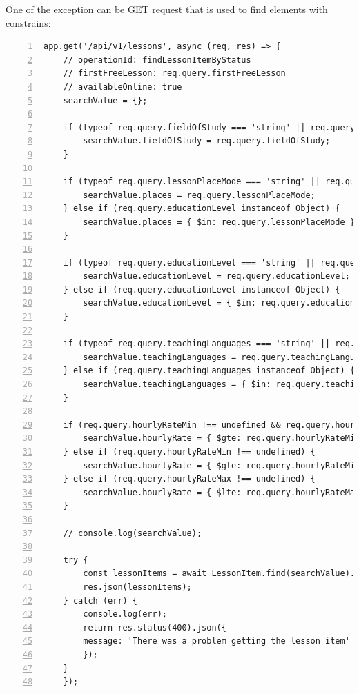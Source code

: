 One of the exception can be GET request that is used to find elements with constrains:
\begin{lstlisting}[breaklines=true, numbers=left, stepnumber=1]
app.get('/api/v1/lessons', async (req, res) => {
    // operationId: findLessonItemByStatus
    // firstFreeLesson: req.query.firstFreeLesson
    // availableOnline: true
    searchValue = {};
    
    if (typeof req.query.fieldOfStudy === 'string' || req.query.fieldOfStudy instanceof String) {
        searchValue.fieldOfStudy = req.query.fieldOfStudy;
    }
    
    if (typeof req.query.lessonPlaceMode === 'string' || req.query.lessonPlaceMode instanceof String) {
        searchValue.places = req.query.lessonPlaceMode;
    } else if (req.query.educationLevel instanceof Object) {
        searchValue.places = { $in: req.query.lessonPlaceMode };
    }
    
    if (typeof req.query.educationLevel === 'string' || req.query.educationLevel instanceof String) {
        searchValue.educationLevel = req.query.educationLevel;
    } else if (req.query.educationLevel instanceof Object) {
        searchValue.educationLevel = { $in: req.query.educationLevel };
    }
    
    if (typeof req.query.teachingLanguages === 'string' || req.query.teachingLanguages instanceof String) {
        searchValue.teachingLanguages = req.query.teachingLanguages;
    } else if (req.query.teachingLanguages instanceof Object) {
        searchValue.teachingLanguages = { $in: req.query.teachingLanguages };
    }
    
    if (req.query.hourlyRateMin !== undefined && req.query.hourlyRateMax !== undefined) {
        searchValue.hourlyRate = { $gte: req.query.hourlyRateMin, $lte: req.query.hourlyRateMax };
    } else if (req.query.hourlyRateMin !== undefined) {
        searchValue.hourlyRate = { $gte: req.query.hourlyRateMin };
    } else if (req.query.hourlyRateMax !== undefined) {
        searchValue.hourlyRate = { $lte: req.query.hourlyRateMax };
    }
    
    // console.log(searchValue);
    
    try {
        const lessonItems = await LessonItem.find(searchValue).lean();
        res.json(lessonItems);
    } catch (err) {
        console.log(err);
        return res.status(400).json({
        message: 'There was a problem getting the lesson item'
        });
    }
    });      
\end{lstlisting}

